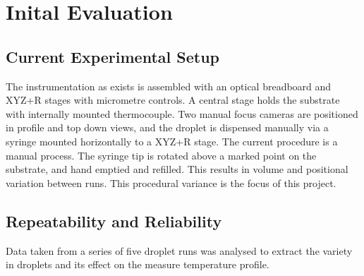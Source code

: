 \chapter{Inital Evaluation}\label{C:init_eval}


\section{Current Experimental Setup}
The instrumentation as exists is assembled with an optical breadboard and XYZ+R stages with micrometre controls. A central stage holds the substrate with internally mounted thermocouple. Two manual focus cameras are positioned in profile and top down views, and the droplet is dispensed manually via a syringe mounted horizontally to a XYZ+R stage.
The current procedure is a manual process. The syringe tip is rotated above a marked point on the substrate, and hand emptied and refilled. This results in volume and positional variation between runs. This procedural variance is the focus of this project.

\section{Repeatability and Reliability}

Data taken from a series of five droplet runs was analysed to extract the variety in droplets and its effect on the measure temperature profile. 

